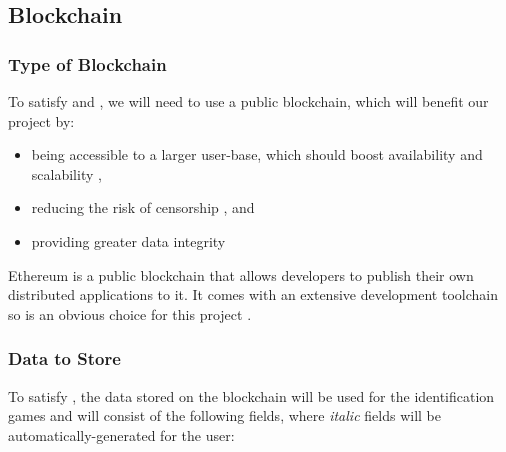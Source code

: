 
\subsection{Blockchain}

\subsubsection*{Type of Blockchain}

To satisfy  and , we will need to use a public blockchain, which will benefit our project by:
\vspace{2mm}
\begin{itemize}
  \item being accessible to a larger user-base, which should boost availability and scalability ,
  \item reducing the risk of censorship , and
  \item providing greater data integrity 
\end{itemize}

\vspace{2mm}\noindent Ethereum is a public blockchain that allows developers to publish their own distributed applications to it. It comes with an extensive development toolchain so is an obvious choice for this project .

\subsubsection*{Data to Store}
\label{subsubsec:eth-data}

To satisfy , the data stored on the blockchain will be used for the identification games and will consist of the following fields, where \textit{italic} fields will be automatically-generated for the user:

